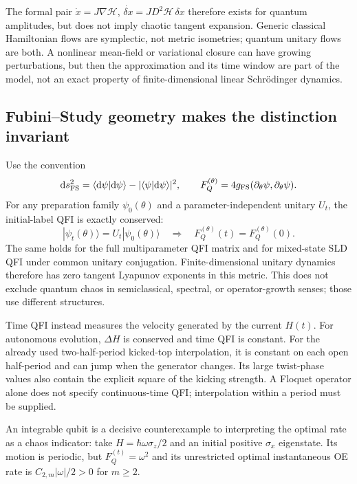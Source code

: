 \documentclass[11pt,a4paper]{article}
\newcommand{\dd}{\mathrm{d}}
\begin{document}
The formal pair $\dot x=J\nabla\mathcal H$, $\dot{\delta x}=JD^2\mathcal H\,\delta x$ therefore exists for quantum amplitudes, but does not imply chaotic tangent expansion. Generic classical Hamiltonian flows are symplectic, not metric isometries; quantum unitary flows are both. A nonlinear mean-field or variational closure can have growing perturbations, but then the approximation and its time window are part of the model, not an exact property of finite-dimensional linear Schr\"odinger dynamics.

\subsection{Fubini--Study geometry makes the distinction invariant}
Use the convention
\[\dd s_{\rm FS}^2=\langle\dd\psi|\dd\psi\rangle-|\langle\psi|\dd\psi\rangle|^2,\qquad F_Q^{(\theta)}=4g_{\rm FS}(\partial_\theta\psi,\partial_\theta\psi).\]
For any preparation family $\psi_0(\theta)$ and a parameter-independent unitary $U_t$, the initial-label QFI is exactly conserved:
\[|\psi_t(\theta)\rangle=U_t|\psi_0(\theta)\rangle\quad\Longrightarrow\quad F_Q^{(\theta)}(t)=F_Q^{(\theta)}(0).\]
The same holds for the full multiparameter QFI matrix and for mixed-state SLD QFI under common unitary conjugation. Finite-dimensional unitary dynamics therefore has zero tangent Lyapunov exponents in this metric. This does not exclude quantum chaos in semiclassical, spectral, or operator-growth senses; those use different structures.

Time QFI instead measures the velocity generated by the current $H(t)$. For autonomous evolution, $\Delta H$ is conserved and time QFI is constant. For the already used two-half-period kicked-top interpolation, it is constant on each open half-period and can jump when the generator changes. Its large twist-phase values also contain the explicit square of the kicking strength. A Floquet operator alone does not specify continuous-time QFI; interpolation within a period must be supplied.

An integrable qubit is a decisive counterexample to interpreting the optimal rate as a chaos indicator: take $H=\hbar\omega\sigma_z/2$ and an initial positive $\sigma_x$ eigenstate. Its motion is periodic, but $F_Q^{(t)}=\omega^2$ and its unrestricted optimal instantaneous OE rate is $C_{2,m}|\omega|/2>0$ for $m\ge2$.
\end{document}
